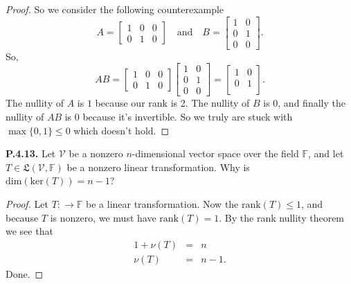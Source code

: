 \documentclass[12pt]{amsart}
\begin{document}
\begin{onehalfspace}
\begin{proof}
            So we consider the following counterexample
            \begin{displaymath}
                A = \left[\begin{matrix}
                              1 & 0 & 0\\
                              0 & 1 & 0
                \end{matrix}\right]
                \quad\text{and}\quad
                B = \left[\begin{matrix}
                              1 & 0\\
                              0 & 1\\
                              0 & 0
                \end{matrix}\right].
            \end{displaymath}
            So,
            \begin{displaymath}
                AB = \left[\begin{matrix}
                              1 & 0 & 0\\
                              0 & 1 & 0
                \end{matrix}\right]
                \left[\begin{matrix}
                          1 & 0\\
                          0 & 1\\
                          0 & 0
                \end{matrix}\right]
                = \left[\begin{matrix}
                            1 & 0\\
                            0 & 1\\
                \end{matrix}\right].
            \end{displaymath}
            The nullity of $A$ is $1$ because our rank is 2.
            The nullity of $B$ is $0$,
            and finally the nullity of $AB$ is $0$ because it's invertible.
            So we truly are stuck with
            $\max\{0,1\}\le 0$ which doesn't hold.
        \end{proof}

        \noindent\textbf{P.4.13.} Let $\mathcal{V}$ be a nonzero $n$-dimensional vector space over the field
        $\mathbb{F}$, and let $T\in\mathfrak{L}(\mathcal{V},\mathbb{F})$ be a nonzero linear transformation.
        Why is $\text{dim}(\text{ker}(T)) = n-1$?
        \begin{proof}
            Let $T:\mathcal\rightarrow\mathbb{F}$ be a linear transformation.
            Now the $\text{rank}(T)\le 1$, and because $T$ is nonzero, we must have
            $\text{rank}(T) = 1$.
            By the rank nullity theorem we see that
            \begin{eqnarray*}
                1 + \nu(T) & = & n \\
                \nu(T) & = & n - 1.
            \end{eqnarray*}
            Done.
        \end{proof}


\end{onehalfspace}
\end{document}

